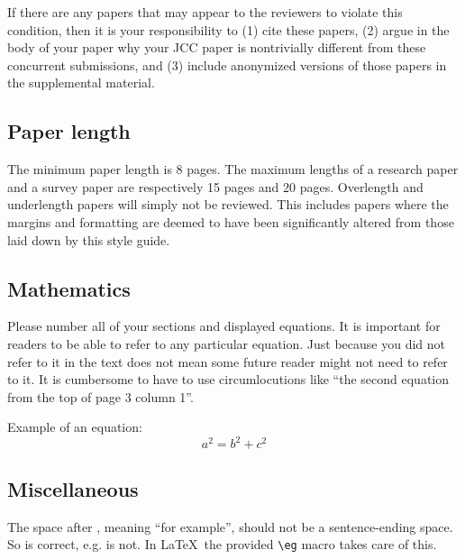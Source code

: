 {If there are any papers that may appear to the reviewers to violate this condition, then it is your responsibility to (1) cite these papers, (2) argue in the body of your paper why your JCC paper is nontrivially different from these concurrent submissions, and (3) include anonymized versions of those papers in the supplemental material.

\subsection{Paper length}

The minimum paper length is 8 pages. The maximum lengths of a research paper and a survey paper are respectively 15 pages and 20 pages. Overlength and underlength papers will simply not be reviewed. This includes papers where the margins and formatting are deemed to have been significantly altered from those laid down by this style guide. 

\subsection{Mathematics}

Please number all of your sections and displayed equations. It is important for readers to be able to refer to any particular equation. Just because you did not refer to it in the text does not mean some future reader might not need to refer to it. It is cumbersome to have to use circumlocutions like ``the second equation from the top of page 3 column 1''.

Example of an equation:
\begin{equation}
a^2 = b^2+c^2
\end{equation}

\subsection{Miscellaneous}

The space after \eg, meaning ``for example'', should not be a sentence-ending space. So \eg is correct, {e.g.} is not. In \LaTeX\, the provided \verb'\eg' macro takes care of this.

}
